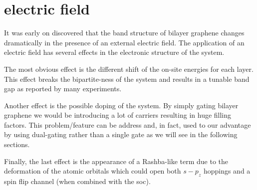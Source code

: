 \section{electric field}
It was early on discovered that the band structure of bilayer graphene changes dramatically in the presence of an external electric field\cite{McCann2006, Castro2007, Oostinga2007, Zhang2009, Taychatanapat2010, Castro2010a, Ponomarenko2011, Allen2012, Sui2015}.
The application of an electric field has several effects in the electronic structure of the system.

The most obvious effect is the different shift of the on-site energies for each layer. This effect breaks the bipartite-ness of the system and results in a tunable band gap as reported by many experiments.

Another effect is the possible doping of the system. By simply gating bilayer graphene we would be introducing a lot of carriers resulting in huge filling factors. This problem/feature can be address and, in fact, used to our advantage by using dual-gating rather than a single gate as we will see in the following sections.

Finally, the last effect is the appearance of a Rashba-like term due to the deformation of the atomic orbitals which could open both $s-p_z$ hoppings and a spin flip channel (when combined with the \ac{soc}).


